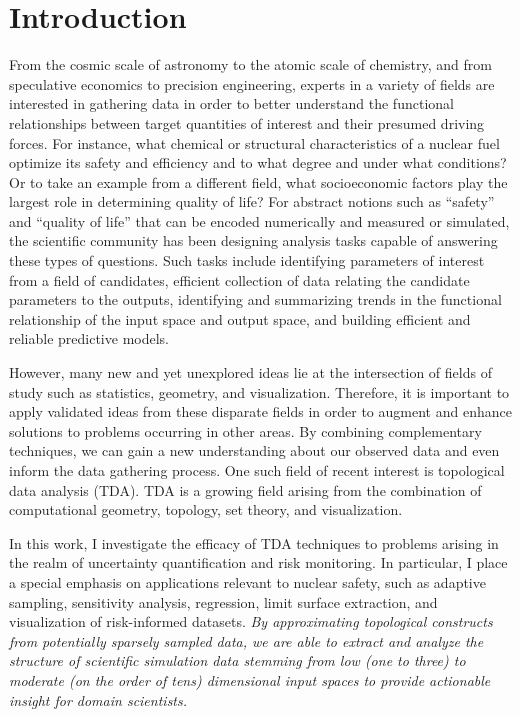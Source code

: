 
\chapter{Introduction}
\label{ch:introduction}
From the cosmic scale of astronomy to the atomic scale of chemistry, and from speculative economics to precision engineering, experts in a variety of fields are interested in gathering data in order to better understand the functional relationships between target quantities of interest and their presumed driving forces.
%
For instance, what chemical or structural characteristics of a nuclear fuel optimize its safety and efficiency and to what degree and under what conditions?
%
Or to take an example from a different field, what socioeconomic factors play the largest role in determining quality of life?
%
For abstract notions such as ``safety'' and ``quality of life'' that can be encoded numerically and measured or simulated, the scientific community has been designing analysis tasks capable of answering these types of questions.
%
Such tasks include identifying parameters of interest from a field of candidates, efficient collection of data relating the candidate parameters to the outputs, identifying and summarizing trends in the functional relationship of the input space and output space, and building efficient and reliable predictive models.

However, many new and yet unexplored ideas lie at the intersection of fields of study such as statistics, geometry, and visualization.
%
Therefore, it is important to apply validated ideas from these disparate fields in order to augment and enhance solutions to problems occurring in other areas.
%
By combining complementary techniques, we can gain a new understanding about our observed data and even inform the data gathering process.
%
One such field of recent interest is topological data analysis (TDA).
%
TDA is a growing field arising from the combination of computational geometry, topology, set theory, and visualization.

In this work, I investigate the efficacy of TDA techniques to problems arising in the realm of uncertainty quantification and risk monitoring.
%
In particular, I place a special emphasis on applications relevant to nuclear safety, such as adaptive sampling, sensitivity analysis, regression, limit surface extraction, and visualization of risk-informed datasets.
%
\textit{By approximating topological constructs from potentially sparsely sampled data, we are able to extract and analyze the structure of scientific simulation data stemming from low (one to three) to moderate (on the order of tens) dimensional input spaces to provide actionable insight for domain scientists.}

